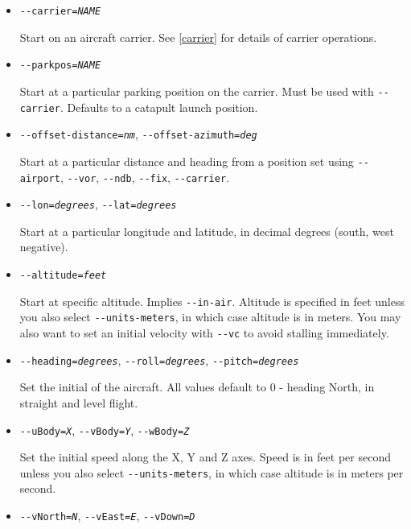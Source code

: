 {\begin{itemize}
\item{\texttt{-$ $-carrier={\it NAME}}}

Start on an aircraft carrier. See \ref{carrier} for details of carrier operations.

\item{\texttt{-$ $-parkpos={\it NAME}}}

Start at a particular parking position on the carrier. Must be used with \texttt{-$ $-carrier}.
Defaults to a catapult launch position.

\item{\texttt{-$ $-offset-distance={\it nm}}, \texttt{-$ $-offset-azimuth={\it deg}}}

Start at a particular distance and heading from a position set using \texttt{-$ $-airport},
\texttt{-$ $-vor}, \texttt{-$ $-ndb}, \texttt{-$ $-fix}, \texttt{-$ $-carrier}.

\item{\texttt{-$ $-lon={\it degrees}}, \texttt{-$ $-lat={\it degrees}}}

Start at a particular longitude and latitude, in decimal degrees (south, west negative).

\item{\texttt{-$ $-altitude={\it feet}}}

Start at specific altitude. Implies \texttt{-$ $-in-air}. Altitude is specified in feet unless you
also select \texttt{-$ $-units-meters}, in which case altitude is in meters. You may also want to set
an initial velocity with \texttt{-$ $-vc} to avoid stalling immediately.

\item{\texttt{-$ $-heading={\it degrees}}, \texttt{-$ $-roll={\it degrees}}, \texttt{-$ $-pitch={\it degrees}}}

Set the initial  of the aircraft. All values default to 0 - heading North, in straight and level flight.

\item{\texttt{-$ $-uBody={\it X}}, \texttt{-$ $-vBody={\it Y}}, \texttt{-$ $-wBody={\it Z}}}

Set the initial speed along the X, Y and Z axes. Speed is in feet per second unless you
also select \texttt{-$ $-units-meters}, in which case altitude is in meters per second.

\item{\texttt{-$ $-vNorth={\it N}}, \texttt{-$ $-vEast={\it E}}, \texttt{-$ $-vDown={\it D}}}


\end{itemize}}
